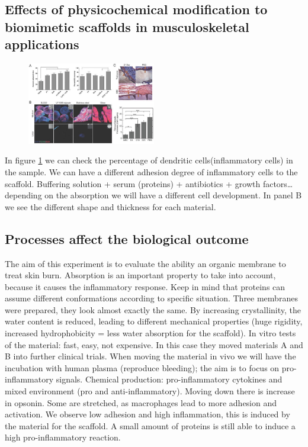 \subsection{Effects of physicochemical modification to biomimetic scaffolds in musculoskeletal applications}
\begin{figure}[ht]
\centering
\includegraphics[width=0.5\textwidth]{muscosk}
\caption{\label{fig:muscosk}}
\end{figure}
\noindent
In figure \ref{fig:muscosk} we can check the percentage of dendritic cells(inflammatory cells) in the sample. 
We can have a different adhesion degree of inflammatory cells to the scaffold. 
Buffering solution + serum (proteins) + antibiotics + growth factors…depending on the absorption we will have a different cell development. 
In panel B we see the different shape and thickness for each material.

\subsection{Processes affect the biological outcome}
The aim of this experiment is to evaluate the ability an organic membrane to treat skin burn. Absorption is an important property to take into account, because it causes the inflammatory response. 
Keep in mind that proteins can assume different conformations according to specific situation. Three membranes were prepared, they look almost exactly the same. 
By increasing crystallinity, the water content is reduced,  leading to different mechanical properties (huge rigidity, increased hydrophobicity = less water absorption for the scaffold). 
In vitro tests of the material: fast, easy, not expensive. 
In this case they moved materials A and B into further clinical trials. When moving the material in vivo we will have the incubation with human plasma (reproduce bleeding); the aim is to focus on pro-inflammatory signals.
Chemical production: pro-inflammatory cytokines and mixed environment (pro and anti-inflammatory). Moving down there is increase in opsonin.  Some are stretched, as macrophages lead to more adhesion and activation. 
We observe low adhesion and high inflammation, this is induced by the material for the scaffold. A small amount of proteins is still able to induce a high pro-inflammatory reaction. 

